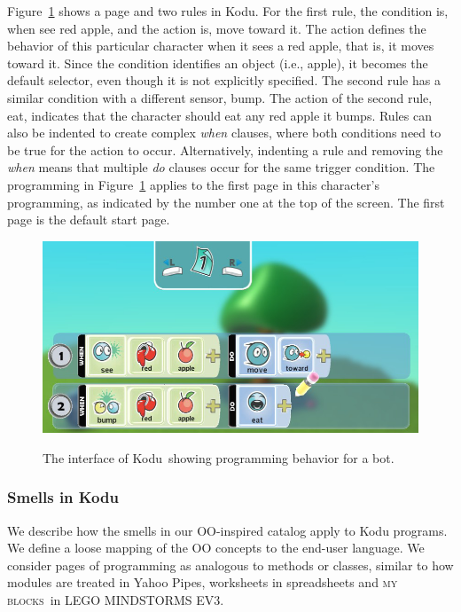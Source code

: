 \documentclass{sig-alternate}
\newcommand{\ms}{LEGO MINDSTORMS EV3}
\newcommand{\mbs}{\textsc{my blocks}}
\begin{document}
Figure~\ref{fig:Kodu} shows a page and two rules  in Kodu. For the first rule, the condition is, when see red apple, and the action is, move toward it. The action defines the behavior of this particular character when it sees a red apple, that is, it moves toward it. Since the condition identifies an object (i.e., apple), it becomes the default selector, even though it is not explicitly specified. The second rule has a similar condition with a different sensor, bump. The action of the second rule, eat, indicates that the character should eat any red apple it bumps. 
Rules can also be indented to create complex \emph{when} clauses, where both conditions need to be true for the action to occur. Alternatively, indenting a rule and removing the \emph{when} means that multiple \emph{do} clauses occur for the same trigger condition. 
The programming in Figure~\ref{fig:Kodu} applies to the first page in this character's programming, as indicated by the number one at the top of the screen. The first page is the default start page.


\begin{figure}[ht]
\caption{The interface of Kodu~showing programming behavior for a bot.}
\centering
\includegraphics[width=\columnwidth]{programmingui.png}
\label{fig:Kodu}
\end{figure}



\subsubsection{Smells in Kodu}
We describe how the smells in our OO-inspired catalog apply to Kodu programs. We define a loose mapping of the OO concepts to the end-user language. We consider pages of programming as analogous to methods or classes, similar to how modules are treated in Yahoo Pipes, worksheets in spreadsheets and \mbs~in \ms. 
\end{document}
